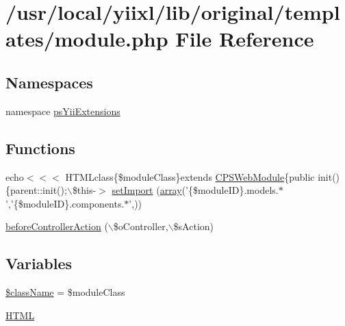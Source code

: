 \hypertarget{module_8php}{
\section{/usr/local/yiixl/lib/original/templates/module.php File Reference}
\label{module_8php}
}
\subsection*{Namespaces}
\begin{DoxyCompactItemize}
\item 
namespace \hyperlink{namespacepsYiiExtensions}{psYiiExtensions}
\end{DoxyCompactItemize}
\subsection*{Functions}
\begin{DoxyCompactItemize}
\item 
echo$<$$<$$<$ HTMLclass\{\$moduleClass\}extends \hyperlink{classCPSWebModule}{CPSWebModule}\{public init()\{parent::init();$\backslash$\$this-\/$>$ \hyperlink{module_8php_a06779d00cde6f35ba9d22ac574677489}{setImport} (\hyperlink{list_8php_aa3205d038c7f8feb5c9f01ac4dfadc88}{array}('\{\$moduleID\}.models.$\ast$','\{\$moduleID\}.components.$\ast$',))
\item 
\hyperlink{module_8php_a26fb69cb51d443c69814cc38d965607e}{beforeControllerAction} ($\backslash$\$oController,$\backslash$\$sAction)
\end{DoxyCompactItemize}
\subsection*{Variables}
\begin{DoxyCompactItemize}
\item 
\hyperlink{module_8php_acd6a475a6eeb092f4eea3e19e502d67d}{\$className} = \$moduleClass
\item 
\hyperlink{module_8php_a2c8135527015cd4586959ac7c2ffec92}{HTML}
\end{DoxyCompactItemize}


